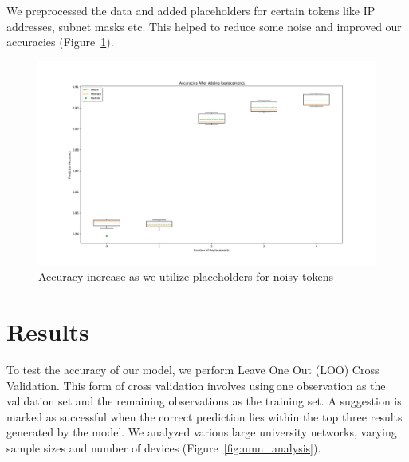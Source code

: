 We preprocessed the data and added placeholders for certain tokens like IP
addresses, subnet masks etc. This helped to reduce some noise and improved our
accuracies (Figure~\ref{fig:replacement_analysis}).
\begin{figure}
	\centering
	\includegraphics[width=\columnwidth]{replacement_analysis.png}
	\caption{Accuracy increase as we utilize placeholders for noisy tokens}
    \label{fig:replacement_analysis}
\end{figure}

\section{Results}

To test the accuracy of our model, we perform Leave One Out (LOO) Cross
Validation. This form of cross validation involves using one observation as
the validation set and the remaining observations as the training set. A
suggestion is marked as successful when the correct prediction lies within the
top three results generated by the model. We analyzed various large university
networks, varying sample sizes and number of devices
(Figure~\ref{fig:umn_analysis}).

